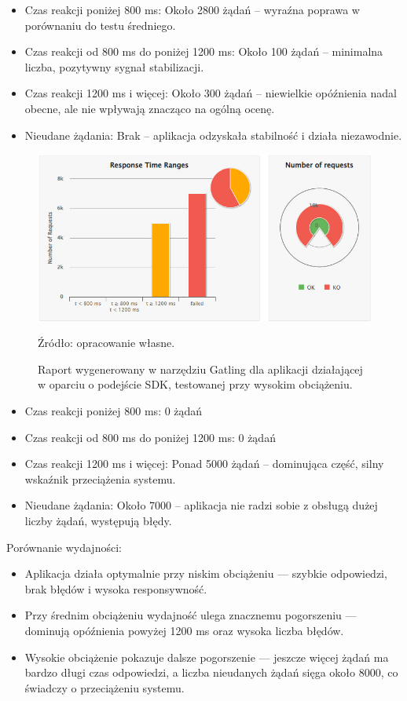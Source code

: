 \documentclass[runningheads,12pt]{llncs}
\begin{document}
\begin{itemize}
    \item Czas reakcji poniżej 800 ms: Około 2800 żądań – wyraźna poprawa w porównaniu do testu średniego.
    \item Czas reakcji od 800 ms do poniżej 1200 ms: Około 100 żądań – minimalna liczba, pozytywny sygnał stabilizacji.
    \item Czas reakcji 1200 ms i więcej: Około 300 żądań – niewielkie opóźnienia nadal obecne, ale nie wpływają znacząco na ogólną ocenę.
    \item Nieudane żądania: Brak – aplikacja odzyskała stabilność i działa niezawodnie.
\end{itemize}

\newpage

\begin{figure}
    \centering
    \includegraphics[width=0.8\linewidth]{images/sdk-gatling-high-graph.jpg}
    \caption{Raport wygenerowany w narzędziu Gatling dla aplikacji działającej w oparciu o podejście SDK, testowanej przy wysokim obciążeniu.}
    \label{fig:high}
    \vspace{0.5em}
    {\small Źródło: opracowanie własne.}
\end{figure}

\begin{itemize}
    \item Czas reakcji poniżej 800 ms: 0 żądań
    \item Czas reakcji od 800 ms do poniżej 1200 ms:  0 żądań
    \item Czas reakcji 1200 ms i więcej: Ponad 5000 żądań – dominująca część, silny wskaźnik przeciążenia systemu.
    \item Nieudane żądania: Około 7000 – aplikacja nie radzi sobie z obsługą dużej liczby żądań, występują błędy.
\end{itemize}

Porównanie wydajności:

\begin{itemize}
    \item Aplikacja działa optymalnie przy niskim obciążeniu — szybkie odpowiedzi, brak błędów i wysoka responsywność.
    \item Przy średnim obciążeniu wydajność ulega znacznemu pogorszeniu — dominują opóźnienia powyżej 1200 ms oraz wysoka liczba błędów.
    \item Wysokie obciążenie pokazuje dalsze pogorszenie — jeszcze więcej żądań ma bardzo długi czas odpowiedzi, a liczba nieudanych żądań sięga około 8000, co świadczy o przeciążeniu systemu.
\end{itemize}
\end{document}
